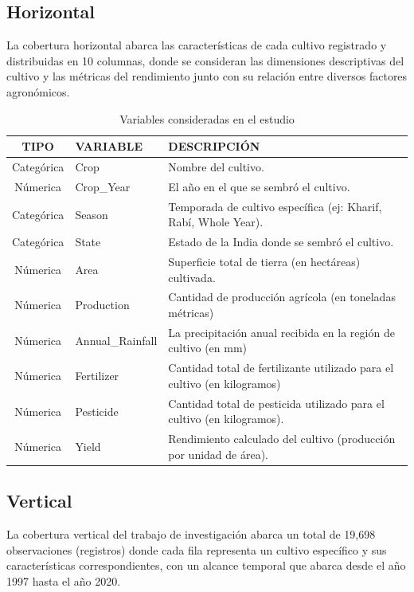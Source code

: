 \documentclass[oneside,11pt]{Latex/Classes/PhDthesisPSnPDF}
\begin{document}
\subsection{Horizontal}

La cobertura horizontal abarca las características de cada cultivo
registrado y distribuidas en 10 columnas, donde se consideran las
dimensiones descriptivas del cultivo y las métricas del rendimiento
junto con su relación entre diversos factores agronómicos.\\

\begin{table}[ht]
\centering
\caption{Variables consideradas en el estudio} 
\resizebox{12cm}{!} {
\begin{tabular}{cll}
  \hline
  \textbf{TIPO} & \textbf{VARIABLE} & \textbf{DESCRIPCIÓN} \\ 
  \hline
  Categórica & Crop & Nombre del cultivo. \\ 
  Númerica & Crop\_Year & El año en el que se sembró el cultivo. \\ 
  Categórica & Season & Temporada de cultivo específica (ej: Kharif, Rabí, Whole Year). \\ 
  Categórica & State & Estado de la India donde se sembró el cultivo. \\ 
  Númerica & Area & Superficie total de tierra (en hectáreas) cultivada. \\ 
  Númerica & Production & Cantidad de producción agrícola (en toneladas métricas) \\ 
  Númerica & Annual\_Rainfall & La precipitación anual recibida en la región de cultivo (en mm) \\ 
  Númerica & Fertilizer & Cantidad total de fertilizante utilizado para el cultivo (en kilogramos) \\ 
  Númerica & Pesticide & Cantidad total de pesticida utilizado para el cultivo (en kilogramos). \\ 
  Númerica & Yield & Rendimiento calculado del cultivo (producción por unidad de área). \\ 
   \hline
\end{tabular}
}
\end{table}

\subsection{Vertical}

La cobertura vertical del trabajo de investigación abarca un total de
19,698 observaciones (registros) donde cada fila representa un cultivo
específico y sus características correspondientes, con un alcance
temporal que abarca desde el año 1997 hasta el año 2020.
\end{document}
